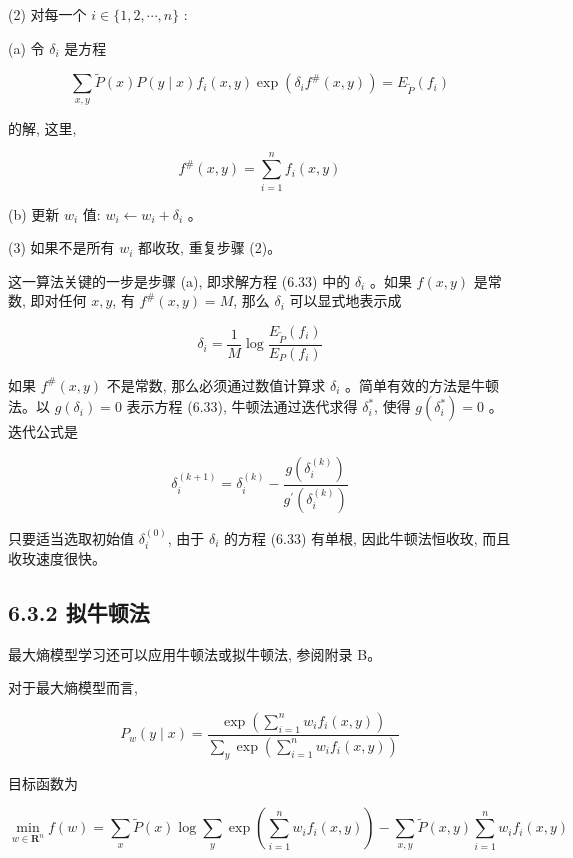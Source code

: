 \documentclass[10pt]{article}
\begin{document}
\begin{CJK*}{UTF8}{bsmi}
(2) 对每一个 $i \in\{1,2, \cdots, n\}$ :

(a) 令 $\delta_{i}$ 是方程

$$
\sum_{x, y} \tilde{P}(x) P(y \mid x) f_{i}(x, y) \exp \left(\delta_{i} f^{\#}(x, y)\right)=E_{\tilde{P}}\left(f_{i}\right)
$$

的解, 这里,

$$
f^{\#}(x, y)=\sum_{i=1}^{n} f_{i}(x, y)
$$

(b) 更新 $w_{i}$ 值: $w_{i} \leftarrow w_{i}+\delta_{i}$ 。

(3) 如果不是所有 $w_{i}$ 都收玫, 重复步骤 (2)。

这一算法关键的一步是步骤 (a), 即求解方程 (6.33) 中的 $\delta_{i}$ 。如果 $f(x, y)$ 是常数, 即对任何 $x, y$, 有 $f^{\#}(x, y)=M$, 那么 $\delta_{i}$ 可以显式地表示成


\begin{equation*}
\delta_{i}=\frac{1}{M} \log \frac{E_{\tilde{P}}\left(f_{i}\right)}{E_{P}\left(f_{i}\right)} \tag{6.34}
\end{equation*}


如果 $f^{\#}(x, y)$ 不是常数, 那么必须通过数值计算求 $\delta_{i}$ 。简单有效的方法是牛顿法。以 $g\left(\delta_{i}\right)=0$ 表示方程 (6.33), 牛顿法通过迭代求得 $\delta_{i}^{*}$, 使得 $g\left(\delta_{i}^{*}\right)=0$ 。迭代公式是


\begin{equation*}
\delta_{i}^{(k+1)}=\delta_{i}^{(k)}-\frac{g\left(\delta_{i}^{(k)}\right)}{g^{\prime}\left(\delta_{i}^{(k)}\right)} \tag{6.35}
\end{equation*}


只要适当选取初始值 $\delta_{i}^{(0)}$, 由于 $\delta_{i}$ 的方程 (6.33) 有单根, 因此牛顿法恒收玫, 而且收玫速度很快。

\subsection*{6.3.2 拟牛顿法}
最大熵模型学习还可以应用牛顿法或拟牛顿法, 参阅附录 B。

对于最大熵模型而言,

$$
P_{w}(y \mid x)=\frac{\exp \left(\sum_{i=1}^{n} w_{i} f_{i}(x, y)\right)}{\sum_{y} \exp \left(\sum_{i=1}^{n} w_{i} f_{i}(x, y)\right)}
$$

目标函数为

$$
\min _{w \in \boldsymbol{R}^{n}} f(w)=\sum_{x} \tilde{P}(x) \log \sum_{y} \exp \left(\sum_{i=1}^{n} w_{i} f_{i}(x, y)\right)-\sum_{x, y} \tilde{P}(x, y) \sum_{i=1}^{n} w_{i} f_{i}(x, y)
$$


\end{CJK*}
\end{document}
